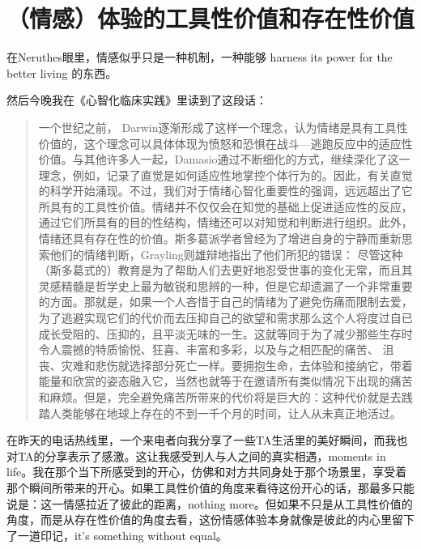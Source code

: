 \chapter{（情感）体验的工具性价值和存在性价值 }




在Neruthes眼里，情感似乎只是一种机制，一种能够 harness its power for the better living 的东西。

然后今晚我在《心智化临床实践》里读到了这段话：

\blockquote{
一个世纪之前， Darwin逐渐形成了这样一个理念，认为情绪是具有工具性价值的，这个理念可以具体体现为愤怒和恐惧在战斗—逃跑反应中的适应性价值。与其他许多人一起，Damasio通过不断细化的方式，继续深化了这一理念，例如，记录了直觉是如何适应性地掌控个体行为的。因此，有关直觉的科学开始涌现。不过，我们对于情绪心智化重要性的强调，远远超出了它所具有的工具性价值。情绪并不仅仅会在知觉的基础上促进适应性的反应，通过它们所具有的目的性结构，情绪还可以对知觉和判断进行组织。此外，情绪还具有存在性的价值。斯多葛派学者曾经为了增进自身的宁静而重新思索他们的情绪判断，Grayling则雄辩地指出了他们所犯的错误：
尽管这种（斯多葛式的）教育是为了帮助人们去更好地忍受世事的变化无常，而且其灵感精髓是哲学史上最为敏锐和思辨的一种，但是它却遗漏了一个非常重要的方面。那就是，如果一个人吝惜于自己的情绪为了避免伤痛而限制去爱，为了逃避实现它们的代价而去压抑自己的欲望和需求那么这个人将度过自已成长受阻的、压抑的，且平淡无味的一生。这就等同于为了减少那些生存时令人震撼的特质\pozhehao{}愉悦、狂喜、丰富和多彩，以及与之相匹配的痛苦、 沮丧、灾难和悲伤\pozhehao{}就选择部分死亡一样。要拥抱生命，去体验和接纳它，带着能量和欣赏的姿态融入它，当然也就等于在邀请所有类似情况下出现的痛苦和麻烦。但是，完全避免痛苦所带来的代价将是巨大的：这种代价就是去践踏人类能够在地球上存在的不到一千个月的时间，让人从未真正地活过。
}

在昨天的电话热线里，一个来电者向我分享了一些TA生活里的美好瞬间，而我也对TA的分享表示了感激。这让我感受到人与人之间的真实相遇，moments in life。我在那个当下所感受到的开心，仿佛和对方共同身处于那个场景里，享受着那个瞬间所带来的开心。如果工具性价值的角度来看待这份开心的话，那最多只能说是：这一情感拉近了彼此的距离，nothing more。但如果不只是从工具性价值的角度，而是从存在性价值的角度去看，这份情感体验本身就像是彼此的内心里留下了一道印记，it's something without equal。

